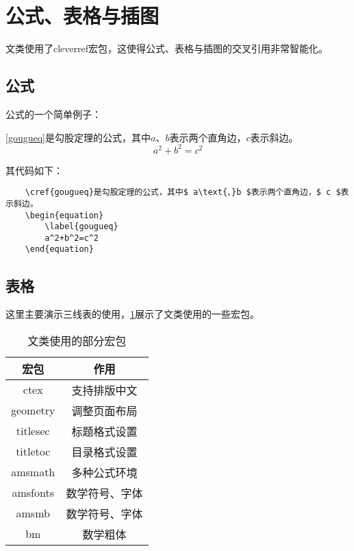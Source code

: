\section{公式、表格与插图}
文类使用了cleverref宏包，这使得公式、表格与插图的交叉引用非常智能化。
\subsection{公式}
公式的一个简单例子：

\cref{gougueq}是勾股定理的公式，其中$ a\text{、}b $表示两个直角边，$ c $表示斜边。
\begin{equation}
	\label{gougueq}
	a^2+b^2=c^2
\end{equation}

其代码如下：
\begin{verbatim}
	\cref{gougueq}是勾股定理的公式，其中$ a\text{、}b $表示两个直角边，$ c $表示斜边。
	\begin{equation}
		\label{gougueq}
		a^2+b^2=c^2
	\end{equation}
\end{verbatim}
\subsection{表格}
这里主要演示三线表的使用，\cref{tab1}展示了文类使用的一些宏包。
\begin{table}[htbp]
	\centering
	\caption{文类使用的部分宏包}
	\label{tab1}
	\begin{tabular}{cc}
		\toprule[1pt]
		\hspace{1cm}宏包\hspace{1cm} & \hspace{3cm}作用\hspace{3cm} \\
		\midrule[0.5pt]
		ctex                         & 支持排版中文                 \\
		geometry                     & 调整页面布局                 \\
		titlesec                     & 标题格式设置                 \\
		titletoc                     & 目录格式设置                 \\
		amsmath                      & 多种公式环境                 \\
		amsfonts                     & 数学符号、字体               \\
		amsmb                        & 数学符号、字体               \\
		bm                           & 数学粗体                     \\
		\bottomrule[1pt]
	\end{tabular}
\end{table}

